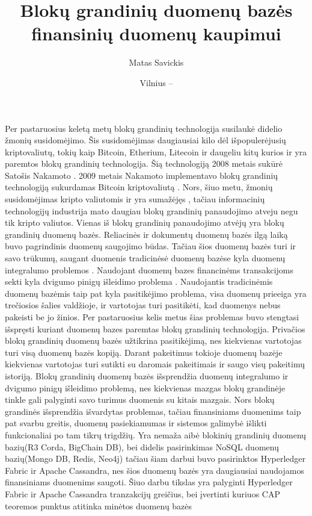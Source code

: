 \documentclass{VUMIFPSkursinis}
\title{Blokų grandinių duomenų bazės finansinių duomenų kaupimui}
\author{Matas Savickis}
\date{Vilnius – \the\year}
\begin{document}
\maketitle

\tableofcontents

Per pastaruosius keletą metų blokų grandinių technologija susilaukė didelio žmonių susidomėjimo. 
Šis susidomėjimas daugiausiai kilo dėl išpopulerėjusių kriptovaliutų, tokių kaip Bitcoin, Etherium, Litecoin ir daugeliu kitų 
kurios ir yra paremtos blokų grandinių technologija. Šią technologiją 2008 metais sukūrė Satošis Nakamoto  \cite{BlockChain}. 
2009 metais Nakamoto implementavo blokų grandinių technologiją sukurdamas Bitcoin kriptovaliutą \cite{Bitcoin}. 
Nors, šiuo metu, žmonių susidomėjimas kripto valiutomis ir yra sumažėjęs \cite{Trends}, tačiau informacinių technologijų industrija 
mato daugiau blokų grandinių panaudojimo atveju negu tik kripto valiutos. Vienas iš blokų grandinių panaudojimo atvėjų yra 
blokų grandinių duomenų bazės. Reliacinės ir dokumentų duomenų bazės ilgą laiką buvo pagrindinis duomenų saugojimo būdas. 
Tačiau šios duomenų bazės turi ir savo trūkumų, saugant duomenis tradicinėsė duomenų bazėse kyla duomenų integralumo problemos \cite{Integrity}
. 
Naudojant duomenų bazes financinėms transakcijoms sekti kyla dvigumo pinigų išleidimo problema\cite{Double}
. Naudojantis tradicinėmis duomenų bazėmis 
taip pat kyla pasitikėjimo problema, visa duomenų prieeiga yra trečiosios šalies valdžioje, ir vartotojas turi pasitikėti, kad duomenys nebus pakeisti be jo žinios.
Per pastaruosius kelis metus šias problemas
 buvo stengtasi išspręsti kuriant duomenų bazes paremtas blokų grandinių technologija. Privačios blokų grandinių duomenų bazės užtikrina pasitikėjimą, nes kiekvienas vartotojas turi visą duomenų 
bazės kopiją. Darant pakeitimus tokioje duomenų bazėje kiekvienas vartotojas turi sutikti su daromais pakeitimais ir saugo visų pakeitimų istoriją. Blokų grandinių duomenų bazės išsprendžia duomenų integralumo ir
dvigumo pinigų išleidimo problemą, nes kiekvienas mazgas blokų grandinėje tinkle gali palyginti savo turimus duomenis su kitais mazgais. 
Nors blokų grandinės išsprendžia išvardytas problemas, tačiau finansiniams duomenims taip pat svarbu greitis, duomenų pasiekiamumas ir sistemos galimybė išlikti funkcionaliai po tam tikrų trigdžių. 
Yra nemaža aibė blokinių grandinių duomenų bazių(R3 Corda, BigChain DB), bei didelis pasirinkimas NoSQL duomenų bazių(Mongo DB, Redis, Neo4j) tačiau šiam darbui buvo pasirinktos
Hyperledger Fabric ir Apache Cassandra, nes šios duomenų bazės yra daugiausiai naudojamos finansiniams duomenims saugoti. Šiuo darbu tikslas yra palyginti Hyperledger Fabric ir Apache Cassandra tranzakcijų greičius, bei įvertinti kuriuos CAP teoremos punktus atitinka minėtos duomenų bazės
\end{document}
